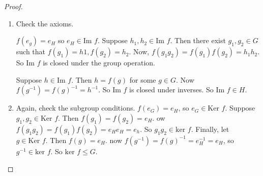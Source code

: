 \documentclass{article}
\theoremstyle{definition}
\begin{document}
\begin{proof}
  \begin{enumerate}
    \item Check the axioms.

      $f(e_g)=e_H$ so $e_H \in \text{Im }f$.
      Suppose $h_1, h_2 \in \text{Im } f$. Then there exist $g_1, g_2 \in G$ such that $f(g_1)=h1, f(g_2)=h_2$. Now, $f(g_1 g_2)=f(g_1)f(g_2)=h_1 h_2$. So $\text{Im }f$ is closed under the group operation.

      Suppose $h \in \text{Im }f. $ Then $h=f(g)$ for some $g \in G$. Now $f(g^{-1})=f(g)^{-1}=h^{-1}$. So $\text{Im }f$ is closed under inverses. So $\text{Im } f \in H $.

    \item Again, check the subgroup conditions.
      $f(e_G)=e_H$, so $e_G \in \text{Ker }f$. Suppose $g_1, g_2 \in \text{Ker }f$. Then $f(g_1)=f(g_2)=e_H$. ow $f(g_1 g_2)=f(g_1)f(g_2)=e_He_H=e_h$. So $g_1 g_2 \in \text{ker }f$. Finally, let $g \in \text{Ker }f$. Then $f(g)=e_H$. now $f(g^{-1})=f(g)^{-1}=e_H^{-1}=e_H$, so $g^{-1} \in \text{ker }f$. So $\text{ker }f \leq G$.
  \end{enumerate}
\end{proof}
\end{document}

